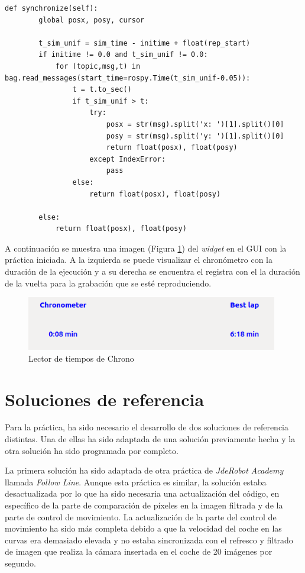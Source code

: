 \lstset{language=Python, breaklines=true, basicstyle=\footnotesize}
\begin{lstlisting}[frame=single]
def synchronize(self):
        global posx, posy, cursor

        t_sim_unif = sim_time - initime + float(rep_start)
        if initime != 0.0 and t_sim_unif != 0.0:
            for (topic,msg,t) in bag.read_messages(start_time=rospy.Time(t_sim_unif-0.05)):
                t = t.to_sec()
                if t_sim_unif > t:
                    try:
                        posx = str(msg).split('x: ')[1].split()[0]
                        posy = str(msg).split('y: ')[1].split()[0]
                        return float(posx), float(posy)
                    except IndexError:
                        pass
                else:
                    return float(posx), float(posy)

        else:
            return float(posx), float(posy)
\end{lstlisting}

A continuación se muestra una imagen (Figura \ref{fig.ltch}) del \textit{widget} en el GUI con la práctica iniciada. A la izquierda se puede visualizar el chronómetro con la duración de la ejecución y a su derecha se encuentra el registra con el la duración de la vuelta para la grabación que se esté reproduciendo.

\begin{figure}[H]
  \begin{center}
    \includegraphics[width=0.98\textwidth]{figures/lector_tiempos_chrono.png}
		\caption{Lector de tiempos de Chrono}
		\label{fig.ltch}
		\end{center}
\end{figure}

\section{Soluciones de referencia}
Para la práctica, ha sido necesario el desarrollo de dos soluciones de referencia distintas. Una de ellas ha sido adaptada de una solución previamente hecha y la otra solución ha sido programada por completo.

La primera solución ha sido adaptada de otra práctica de \textit{JdeRobot Academy} llamada \textit{Follow Line}. Aunque esta práctica es similar, la solución estaba desactualizada por lo que ha sido necesaria una actualización del código, en específico de la parte de comparación de píxeles en la imagen filtrada y de la parte de control de movimiento. La actualización de la parte del control de movimiento ha sido más completa debido a que la velocidad del coche en las curvas era demasiado elevada y no estaba sincronizada con el refresco y filtrado de imagen que realiza la cámara insertada en el coche de 20 imágenes por segundo.

